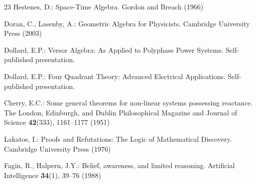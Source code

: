 \documentclass[runningheads]{llncs}
\begin{document}
\begin{thebibliography}{23}
Hestenes, D.: Space-Time Algebra. Gordon and Breach (1966)

Doran, C., Lasenby, A.: Geometric Algebra for Physicists.
Cambridge University Press (2003)

Dollard, E.P.: Versor Algebra: As Applied to Polyphase Power Systems.
Self-published presentation.

Dollard, E.P.: Four Quadrant Theory: Advanced Electrical Applications.
Self-published presentation.

Cherry, E.C.: Some general theorems for non-linear systems possessing reactance.
The London, Edinburgh, and Dublin Philosophical Magazine and Journal of Science
\textbf{42}(333), 1161--1177 (1951)

Lakatos, I.: Proofs and Refutations: The Logic of Mathematical Discovery.
Cambridge University Press (1976)

Fagin, R., Halpern, J.Y.: Belief, awareness, and limited reasoning.
Artificial Intelligence \textbf{34}(1), 39--76 (1988)

\end{thebibliography}
\end{document}
